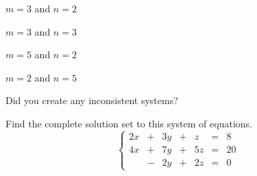\documentclass[elementsmain.tex]{subfiles}
\begin{document}
\begin{exercise} $m=3$ and $n=2$
\end{exercise}

\begin{exercise} $m=3$ and $n=3$
\end{exercise}

\begin{exercise} $m=5$ and $n=2$
\end{exercise}

\begin{exercise} $m=2$ and $n=5$
\end{exercise}

Did you create any inconsistent systems?



\begin{exercise} Find the complete solution set to this system of equations.
\begin{equation*}
\left\{\begin{array}{rrrrrrr}
       2x & + & 3y & + &  z & = & 8\\
       4x & + & 7y & + & 5z & = & 20 \\
          & - & 2y & + & 2z & = & 0
       \end{array}\right.
\end{equation*}
\end{exercise}



\clearpage
\end{document}
